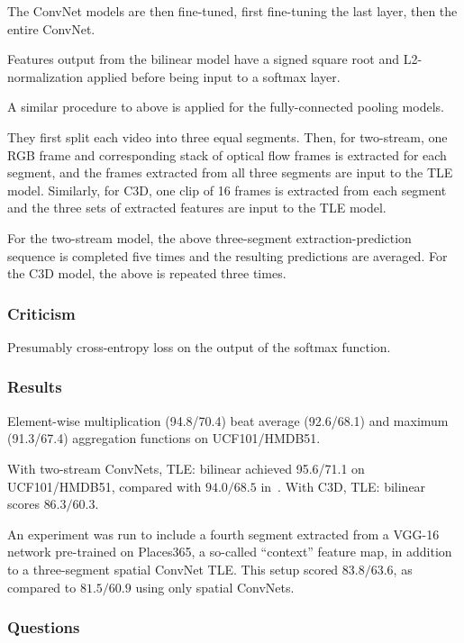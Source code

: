 \documentclass[a4paper, 12pt]{article}
\begin{document}
The ConvNet models are then fine-tuned, first fine-tuning the last layer, then
the entire ConvNet.

Features output from the bilinear model have a signed square root and
L2-normalization applied before being input to a softmax layer.

A similar procedure to above is applied for the fully-connected pooling models.

They first split each video into three equal segments. Then, for two-stream,
one RGB frame and corresponding stack of optical flow frames is extracted for
each segment, and the frames extracted from all three segments are input to the
TLE model. Similarly, for C3D, one clip of 16 frames is extracted from each
segment and the three sets of extracted features are input to the TLE model.

For the two-stream model, the above three-segment extraction-prediction
sequence is completed five times and the resulting predictions are averaged.
For the C3D model, the above is repeated three times.

\subsubsection{Criticism}

Presumably cross-entropy loss on the output of the softmax function.

\subsubsection{Results}

Element-wise multiplication (94.8/70.4) beat average (92.6/68.1) and maximum
(91.3/67.4) aggregation functions on UCF101/HMDB51.

With two-stream ConvNets, TLE\@: bilinear achieved 95.6/71.1 on UCF101/HMDB51,
compared with $94.0/68.5$ in~\citet{DBLP:journals/corr/WangXW0LTG16}. With C3D,
TLE\@: bilinear scores $86.3/60.3$.

An experiment was run to include a fourth segment extracted from a VGG-16
network pre-trained on Places365, a so-called ``context'' feature map, in
addition to a three-segment spatial ConvNet TLE\@. This setup scored
$83.8/63.6$, as compared to $81.5/60.9$ using only spatial ConvNets\@.

\subsubsection{Questions}
\end{document}
